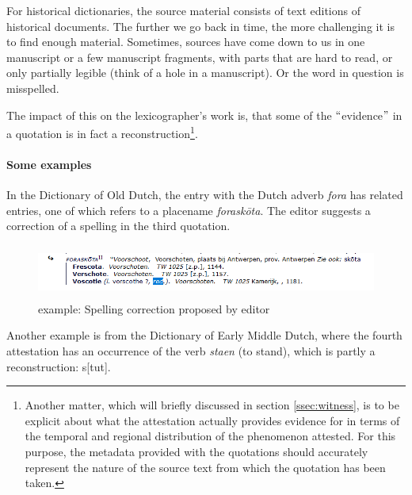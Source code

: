 \documentclass[10pt]{article}
\begin{document}
For historical dictionaries, the source material consists of text editions of historical documents. The further we go back in time, the more challenging it is to find enough material. Sometimes, sources have come down to us in one manuscript or a few manuscript fragments, with parts that are hard to read, or only partially legible (think of a hole in a manuscript). Or the word in question is misspelled.\par


The impact of this on the lexicographer’s work is, that some of the $``$evidence$"$  in a quotation is in fact a reconstruction\footnote{Another matter, which will briefly discussed in section \ref{ssec:witness}, is to be explicit about what the attestation actually provides evidence for in terms of the temporal and regional distribution of the phenomenon attested. For this purpose, the metadata provided with the quotations should accurately represent the nature of the source text from which the quotation has been taken.}.\par



\paragraph*{Some examples}

 In the Dictionary of Old Dutch, the entry with the Dutch adverb \textit{fora }has related entries, one of which refers to a placename \textit{foraskōta}. The editor suggests a correction of a spelling in the third quotation.\par




\begin{figure}[H]
	\begin{Center}
		\includegraphics[width=6.27in,height=0.69in]{./image18.png}
	\end{Center}
	\caption{example: Spelling correction proposed by editor}
\end{figure}



 Another example is from the Dictionary of Early Middle Dutch, where the fourth attestation has an occurrence of the verb \textit{staen }(to stand), which is partly a reconstruction: s[tut].\par
\end{document}
